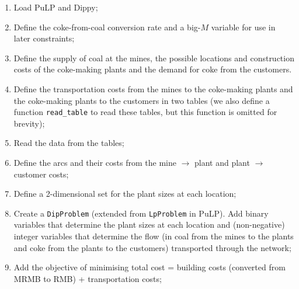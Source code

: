 \begin{enumerate}
\item Load PuLP and Dippy;


\item Define the coke-from-coal conversion rate and a big-$M$ variable for use in later constraints;


\item Define the supply of coal at the mines, the possible locations and construction costs of the coke-making plants and the demand for coke from the customers.

\newpage


\item Define the transportation costs from the mines to the coke-making plants and the coke-making plants to the customers in two tables (we also define a function {\tt read\_table} to read these tables, but this function is omitted for brevity);


\item Read the data from the tables;


\item Define the arcs and their costs from the mine $\rightarrow$ plant and plant $\rightarrow$ customer costs;


\item \label{itm:2d} Define a 2-dimensional set for the plant sizes at each location;


\item Create a \texttt{DipProblem} (extended from \texttt{LpProblem} in PuLP). Add binary variables that determine the plant sizes at each location and (non-negative) integer variables that determine the flow (in coal from the mines to the plants and coke from the plants to the customers) transported through the network;


\item Add the objective of minimising total cost = building costs (converted from MRMB to RMB) + transportation costs;



\end{enumerate}
